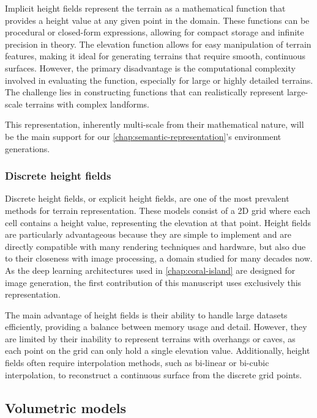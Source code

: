 Implicit height fields represent the terrain as a mathematical function that provides a height value at any given point in the domain. These functions can be procedural or closed-form expressions, allowing for compact storage and infinite precision in theory. The elevation function allows for easy manipulation of terrain features, making it ideal for generating terrains that require smooth, continuous surfaces. However, the primary disadvantage is the computational complexity involved in evaluating the function, especially for large or highly detailed terrains. The challenge lies in constructing functions that can realistically represent large-scale terrains with complex landforms.

This representation, inherently multi-scale from their mathematical nature, will be the main support for our \cref{chap:semantic-representation}'s environment generations.

\subsubsection{Discrete height fields}
Discrete height fields, or explicit height fields, are one of the most prevalent methods for terrain representation. These models consist of a 2D grid where each cell contains a height value, representing the elevation at that point. Height fields are particularly advantageous because they are simple to implement and are directly compatible with many rendering techniques and hardware, but also due to their closeness with image processing, a domain studied for many decades now. As the deep learning architectures used in \cref{chap:coral-island} are designed for image generation, the first contribution of this manuscript uses exclusively this representation.

The main advantage of height fields is their ability to handle large datasets efficiently, providing a balance between memory usage and detail. However, they are limited by their inability to represent terrains with overhangs or caves, as each point on the grid can only hold a single elevation value. Additionally, height fields often require interpolation methods, such as bi-linear or bi-cubic interpolation, to reconstruct a continuous surface from the discrete grid points. 

\subsection{Volumetric models}

